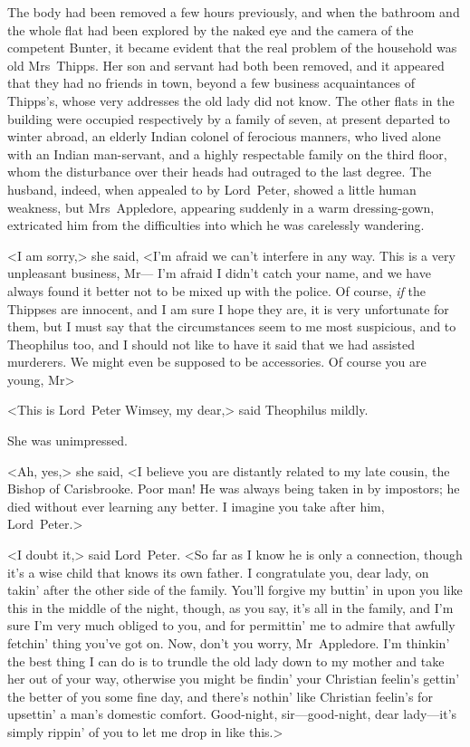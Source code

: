 The body had been removed a few hours previously, and when the bathroom and the whole flat had been explored by the naked eye and the camera of the competent Bunter, it became evident that the real problem of the household was old Mrs~Thipps. Her son and servant had both been removed, and it appeared that they had no friends in town, beyond a few business acquaintances of Thipps's, whose very addresses the old lady did not know. The other flats in the building were occupied respectively by a family of seven, at present departed to winter abroad, an elderly Indian colonel of ferocious manners, who lived alone with an Indian man-servant, and a highly respectable family on the third floor, whom the disturbance over their heads had outraged to the last degree. The husband, indeed, when appealed to by Lord~Peter, showed a little human weakness, but Mrs~Appledore, appearing suddenly in a warm dressing-gown, extricated him from the difficulties into which he was carelessly wandering.

<I am sorry,> she said, <I'm afraid we can't interfere in any way. This is a very unpleasant business, Mr— I'm afraid I didn't catch your name, and we have always found it better not to be mixed up with the police. Of course, \emph{if} the Thippses are innocent, and I am sure I hope they are, it is very unfortunate for them, but I must say that the circumstances seem to me most suspicious, and to Theophilus too, and I should not like to have it said that we had assisted murderers. We might even be supposed to be accessories. Of course you are young, Mr\longdash>

<This is Lord~Peter Wimsey, my dear,> said Theophilus mildly.

She was unimpressed.

<Ah, yes,> she said, <I believe you are distantly related to my late cousin, the Bishop of Carisbrooke. Poor man! He was always being taken in by impostors; he died without ever learning any better. I imagine you take after him, Lord~Peter.>

<I doubt it,> said Lord~Peter. <So far as I know he is only a connection, though it's a wise child that knows its own father. I congratulate you, dear lady, on takin' after the other side of the family. You'll forgive my buttin' in upon you like this in the middle of the night, though, as you say, it's all in the family, and I'm sure I'm very much obliged to you, and for permittin' me to admire that awfully fetchin' thing you've got on. Now, don't you worry, Mr~Appledore. I'm thinkin' the best thing I can do is to trundle the old lady down to my mother and take her out of your way, otherwise you might be findin' your Christian feelin's gettin' the better of you some fine day, and there's nothin' like Christian feelin's for upsettin' a man's domestic comfort. Good-night, sir—good-night, dear lady—it's simply rippin' of you to let me drop in like this.>

